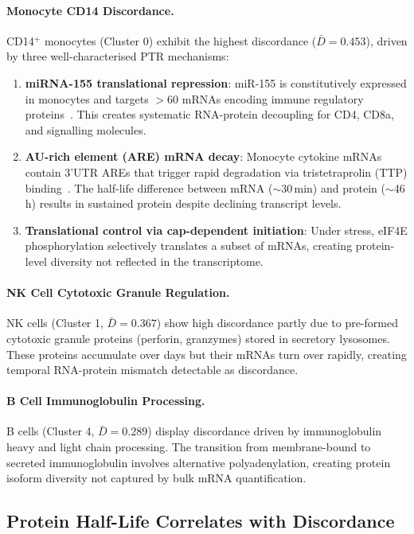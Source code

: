\documentclass[11pt,a4paper]{article}
\begin{document}
\paragraph{Monocyte CD14 Discordance.}
CD14$^+$ monocytes (Cluster 0) exhibit the highest discordance ($\bar{D}=0.453$), driven by three well-characterised PTR mechanisms:

\begin{enumerate}[leftmargin=*]
  \item \textbf{miRNA-155 translational repression}: miR-155 is constitutively expressed in monocytes and targets $>$60 mRNAs encoding immune regulatory proteins~\citep{ohara2010}. This creates systematic RNA-protein decoupling for CD4, CD8a, and signalling molecules.
  \item \textbf{AU-rich element (ARE) mRNA decay}: Monocyte cytokine mRNAs contain 3'UTR AREs that trigger rapid degradation via tristetraprolin (TTP) binding~\citep{chen2007}. The half-life difference between mRNA ($\sim$30\,min) and protein ($\sim$46\,h) results in sustained protein despite declining transcript levels.
  \item \textbf{Translational control via cap-dependent initiation}: Under stress, eIF4E phosphorylation selectively translates a subset of mRNAs, creating protein-level diversity not reflected in the transcriptome.
\end{enumerate}

\paragraph{NK Cell Cytotoxic Granule Regulation.}
NK cells (Cluster 1, $\bar{D}=0.367$) show high discordance partly due to pre-formed cytotoxic granule proteins (perforin, granzymes) stored in secretory lysosomes.
These proteins accumulate over days but their mRNAs turn over rapidly, creating temporal RNA-protein mismatch detectable as discordance.

\paragraph{B Cell Immunoglobulin Processing.}
B cells (Cluster 4, $\bar{D}=0.289$) display discordance driven by immunoglobulin heavy and light chain processing.
The transition from membrane-bound to secreted immunoglobulin involves alternative polyadenylation, creating protein isoform diversity not captured by bulk mRNA quantification.

\subsection{Protein Half-Life Correlates with Discordance}
\end{document}
